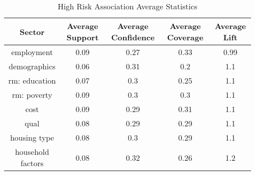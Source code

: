 \begin{table}[h]
    \centering
    \caption{High Risk Association Average Statistics}
    \label{tab:high_risk_ass} %
    \begin{tabular}{|c|c|c|c|c|}
    \hline
    Sector & Average Support & Average Confidence & Average Coverage & Average Lift \\
    \hline
    employment & 0.09 & 0.27 & 0.33 & 0.99 \\
    \hline
    demographics & 0.06 & 0.31 & 0.2 & 1.1 \\
    \hline
    rm: education & 0.07 & 0.3 & 0.25 & 1.1 \\
    \hline
    rm: poverty & 0.09 & 0.3 & 0.3 & 1.1 \\
    \hline
    cost & 0.09 & 0.29 & 0.31 & 1.1 \\
    \hline
    qual & 0.08 & 0.29 & 0.29 & 1.1 \\
    \hline
    housing type & 0.08 & 0.3 & 0.29 & 1.1 \\
    \hline
    household factors & 0.08 & 0.32 & 0.26 & 1.2 \\
    \hline
    \end{tabular}
\end{table}